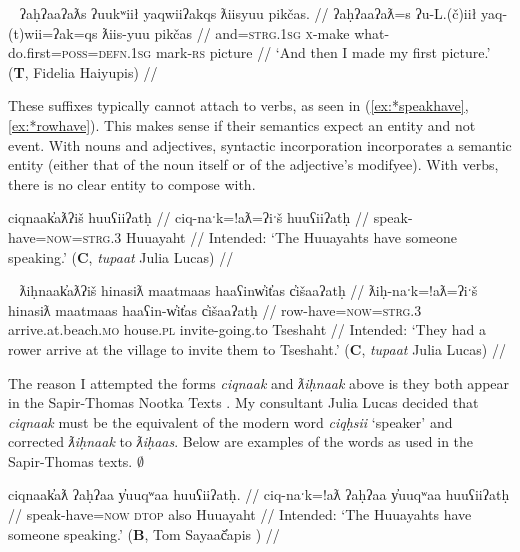 \begin{comment}
\ex \label{ex:mightnotgive}
\begingl
\glpreamble wikcumʔick huʔayi siičił waaʔaƛ. //
\gla wik-cum=ʔick huʔa-ayiˑ si-L.(č)ił waa=!aƛ //
\glb \textsc{neg}-might=\textsc{real.2sg} back-give \textsc{1sg}-\textsc{do.to} say=\textsc{now} //
\glft ` ``You might not give it back," he said.' (\textbf{C}, \textit{tupaat} Julia Lucas) //
\endgl
\xe
\end{comment}

\ex~ \label{ex:mightnotgive}
\begingl
\glpreamble ʔaḥʔaaʔaƛs ʔuukʷiił yaqwiiʔakqs ƛiisyuu pikčas. //
\gla ʔaḥʔaaʔaƛ=s ʔu-L.(č)iił yaq-(t)wii=ʔak=qs ƛiis-yuu pikčas //
\glb and=\textsc{strg.1sg} \textsc{x}-make what-do.first=\textsc{poss}=\textsc{defn.1sg} mark-\textsc{rs} picture //
\glft `And then I made my first picture.' (\textbf{T}, Fidelia Haiyupis) //
\endgl
\xe

These suffixes typically cannot attach to verbs, as seen in (\ref{ex:*speakhave},\ref{ex:*rowhave}). This makes sense if their semantics expect an entity and not event. With nouns and adjectives, syntactic incorporation incorporates a semantic entity (either that of the noun itself or of the adjective's modifyee). With verbs, there is no clear entity to compose with.

\ex \label{ex:*speakhave}
\begingl
\glpreamble *ciqnaak̓aƛʔiš huuʕiiʔatḥ //
\gla ciq-naˑk=!aƛ=ʔiˑš huuʕiiʔatḥ //
\glb speak-have=\textsc{now}=\textsc{strg.3} Huuayaht //
\glft Intended: `The Huuayahts have someone speaking.' (\textbf{C}, \textit{tupaat} Julia Lucas) //
\endgl
\xe

\ex~ \label{ex:*rowhave}
\begingl
\glpreamble *ƛiḥnaak̓aƛʔiš hinasiƛ maatmaas haaʕinw̓it̓as c̓išaaʔatḥ //
\gla ƛiḥ-naˑk=!aƛ=ʔiˑš hinasiƛ maatmaas haaʕin-w̓it̓as c̓išaaʔatḥ //
\glb row-have=\textsc{now}=\textsc{strg.3} arrive.at.beach.\textsc{mo} house.\textsc{pl} invite-going.to Tseshaht //
\glft Intended: `They had a rower arrive at the village to invite them to Tseshaht.' (\textbf{C}, \textit{tupaat} Julia Lucas) //
\endgl
\xe

The reason I attempted the forms \textit{ciqnaak} and \textit{ƛiḥnaak} above is they both appear in the Sapir-Thomas Nootka Texts \citep{sapir1939, sapir1955}. My consultant Julia Lucas decided that \textit{ciqnaak} must be the equivalent of the modern word \textit{ciqḥsii} `speaker' and corrected \textit{ƛiḥnaak} to \textit{ƛiḥaas}. Below are examples of the words as used in the Sapir-Thomas texts. $\emptyset$

\ex \label{ex:speakhave}
\begingl
\glpreamble ciqnaak̓aƛ ʔaḥʔaa y̓uuqʷaa huuʕiiʔatḥ. //
\gla ciq-naˑk=!aƛ ʔaḥʔaa y̓uuqʷaa huuʕiiʔatḥ //
\glb speak-have=\textsc{now} \textsc{dtop} also Huuayaht //
\glft Intended: `The Huuayahts have someone speaking.' (\textbf{B}, Tom Sayaač̓apis \citet[p.~169]{sapir1955}) //
\endgl
\xe

